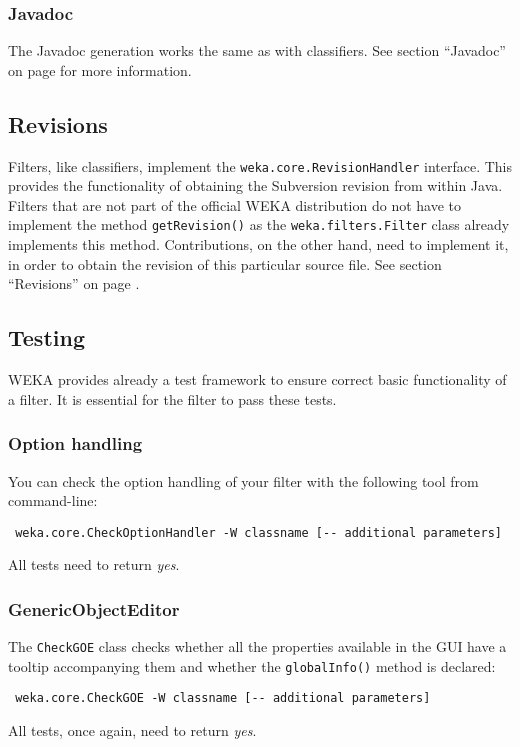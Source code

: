 \subsubsection*{Javadoc}
The Javadoc generation works the same as with classifiers. See section
``Javadoc'' on page \pageref{classifier_javadoc} for more information.

\subsection{Revisions}
\label{filter_revisions}
Filters, like classifiers, implement the \texttt{weka.core.RevisionHandler}
interface. This provides the functionality of obtaining the Subversion revision
from within Java. Filters that are not part of the official WEKA distribution
do not have to implement the method \texttt{getRevision()} as the
\texttt{weka.filters.Filter} class already implements this method.
Contributions, on the other hand, need to implement it, in order to
obtain the revision of this particular source file. See section ``Revisions''
on page \pageref{classifier_revisions}.

\newpage
\subsection{Testing}
WEKA provides already a test framework to ensure correct basic functionality of
a filter. It is essential for the filter to pass these tests.

\subsubsection{Option handling}
You can check the option handling of your filter with the following tool from
command-line:
\begin{verbatim}
 weka.core.CheckOptionHandler -W classname [-- additional parameters]
\end{verbatim}
All tests need to return \textit{yes}.

\subsubsection{GenericObjectEditor}
The \texttt{CheckGOE} class checks whether all the properties available in the
GUI have a tooltip accompanying them and whether the \texttt{globalInfo()}
method is declared:
\begin{verbatim}
 weka.core.CheckGOE -W classname [-- additional parameters]
\end{verbatim}
All tests, once again, need to return \textit{yes}.

